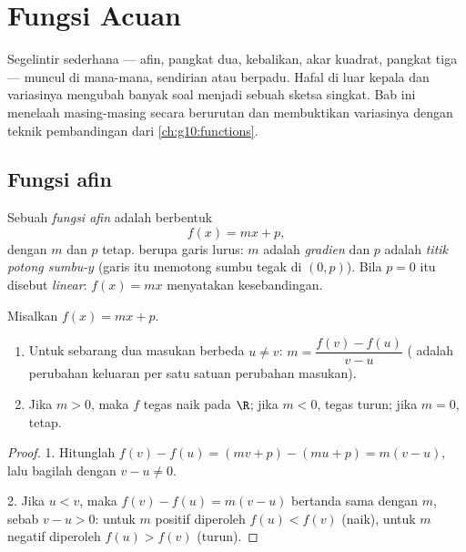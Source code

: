 \chapter{Fungsi Acuan}\label{ch:g10:reffunc}

Segelintir  sederhana --- afin, pangkat dua, kebalikan, akar kuadrat,
pangkat tiga --- muncul di mana-mana, sendirian atau berpadu. Hafal di luar
kepala  dan variasinya mengubah banyak soal menjadi sebuah sketsa
singkat. Bab ini menelaah masing-masing secara berurutan dan membuktikan
variasinya dengan teknik pembandingan dari \cref{ch:g10:functions}.

\section{Fungsi afin}

\begin{definition}\label{def:g10:reffunc:affine}
Sebuah \emph{fungsi afin} adalah  berbentuk
\[
f(x) = mx + p,
\]
dengan $m$ dan $p$  tetap.  berupa garis lurus:
$m$ adalah \emph{gradien} dan $p$ adalah
\emph{titik potong sumbu-$y$} (garis itu
memotong sumbu tegak di $(0, p)$). Bila $p = 0$  itu disebut
\emph{linear}: $f(x) = mx$ menyatakan kesebandingan.
\end{definition}

\begin{proposition}\label{prop:g10:reffunc:affine}
Misalkan $f(x) = mx + p$.
\begin{enumerate}
  \item Untuk sebarang dua masukan berbeda $u \neq v$:
        $m = \dfrac{f(v) - f(u)}{v - u}$ ( adalah perubahan
        keluaran per satu satuan perubahan masukan).
  \item Jika $m > 0$, maka $f$ tegas naik pada $\R$; jika $m < 0$, tegas
        turun; jika $m = 0$, tetap.
\end{enumerate}
\end{proposition}

\begin{proof}
1. Hitunglah $f(v) - f(u) = (mv + p) - (mu + p) = m(v - u)$, lalu bagilah
dengan $v - u \neq 0$.

2. Jika $u < v$, maka $f(v) - f(u) = m(v-u)$ bertanda sama dengan $m$, sebab
$v - u > 0$: untuk $m$ positif diperoleh $f(u) < f(v)$ (naik), untuk $m$
negatif diperoleh $f(u) > f(v)$ (turun).
\end{proof}

